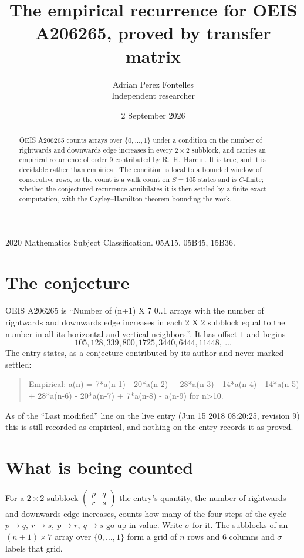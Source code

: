 \documentclass[11pt,a4paper]{article}
\title{The empirical recurrence for OEIS A206265, proved by transfer matrix}
\author{Adrian Perez Fontelles\\ \small Independent researcher}
\date{2 September 2026}
\theoremstyle{plain}
\theoremstyle{definition}
\begin{document}
\maketitle

\begin{abstract}
OEIS A206265 counts arrays over $\{0,\dots,1\}$ under a condition on the number of rightwards and downwards edge increases
in every $2\times2$ subblock, and carries an empirical recurrence of order $9$ contributed by
R.~H.~Hardin. It is true, and it is decidable rather than empirical. The condition is local to
a bounded window of consecutive rows, so the count is a walk count on $S=105$ states and is
$C$-finite; whether the conjectured recurrence annihilates it is then settled by a finite exact
computation, with the Cayley--Hamilton theorem bounding the work.
\end{abstract}

\noindent\small 2020 Mathematics Subject Classification. 05A15, 05B45, 15B36.\normalsize

\section{The conjecture}

OEIS A206265 is ``Number of (n+1) X 7 0..1 arrays with the number of rightwards and downwards edge increases in each 2 X 2 subblock equal to the number in all its horizontal and vertical neighbors.''. It has offset $1$ and begins
\[
105, 128, 339, 800, 1725, 3440, 6444, 11448,\ \dots
\]
The entry states, as a conjecture contributed by its author and never marked settled:
\begin{quote}
Empirical: a(n) = 7*a(n-1) - 20*a(n-2) + 28*a(n-3) - 14*a(n-4) - 14*a(n-5) + 28*a(n-6) - 20*a(n-7) + 7*a(n-8) - a(n-9) for n>10.
\end{quote}
As of the ``Last modified'' line on the live entry (Jun 15 2018 08:20:25, revision 9) this is still
recorded as empirical, and nothing on the entry records it as proved.

\section{What is being counted}

For a $2\times2$ subblock $\begin{pmatrix}p&q\\r&s\end{pmatrix}$ the
entry's quantity, the number of rightwards and downwards edge increases, counts how many of the four steps of the cycle $p\to q,\ r\to s,\ p\to r,\ q\to s$ go up in value. Write $\sigma$ for it. The subblocks of an
$(n+1)\times7$ array over $\{0,\dots,1\}$ form a grid of $n$ rows and $6$
columns and $\sigma$ labels that grid.
\end{document}
